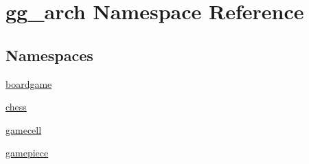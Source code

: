 \hypertarget{namespacegg__arch}{\section{gg\-\_\-arch Namespace Reference}
\label{namespacegg__arch}
}
\subsection*{Namespaces}
\begin{DoxyCompactItemize}
\item 
\hyperlink{namespacegg__arch_1_1boardgame}{boardgame}
\item 
\hyperlink{namespacegg__arch_1_1chess}{chess}
\item 
\hyperlink{namespacegg__arch_1_1gamecell}{gamecell}
\item 
\hyperlink{namespacegg__arch_1_1gamepiece}{gamepiece}
\end{DoxyCompactItemize}
